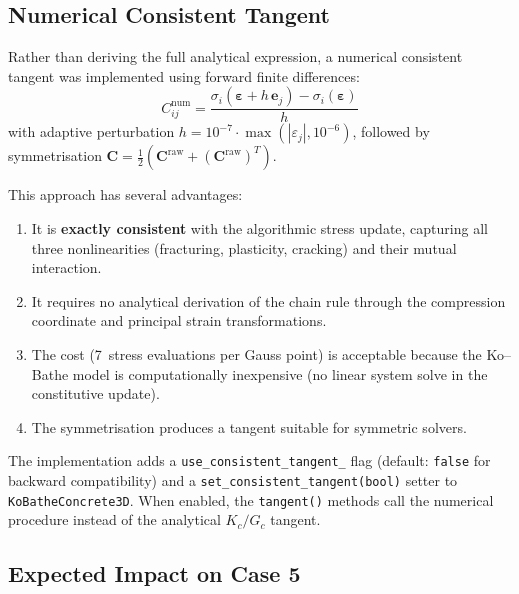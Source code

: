 \subsection{Numerical Consistent Tangent}

Rather than deriving the full analytical expression, a numerical
consistent tangent was implemented using forward finite differences:
\begin{equation}
  C_{ij}^{\text{num}} =
    \frac{\sigma_i(\boldsymbol{\varepsilon} + h\, \mathbf{e}_j)
        - \sigma_i(\boldsymbol{\varepsilon})}{h}
  \label{eq:numerical-tangent}
\end{equation}
with adaptive perturbation $h = 10^{-7} \cdot
\max(|\varepsilon_j|, 10^{-6})$, followed by symmetrisation
$\mathbf{C} = \tfrac{1}{2}(\mathbf{C}^{\text{raw}} +
(\mathbf{C}^{\text{raw}})^T)$.

This approach has several advantages:
\begin{enumerate}
  \item It is \textbf{exactly consistent} with the algorithmic stress
    update, capturing all three nonlinearities (fracturing, plasticity,
    cracking) and their mutual interaction.
  \item It requires no analytical derivation of the chain rule through
    the compression coordinate and principal strain transformations.
  \item The cost (7~stress evaluations per Gauss point) is acceptable
    because the Ko--Bathe model is computationally inexpensive (no
    linear system solve in the constitutive update).
  \item The symmetrisation produces a tangent suitable for symmetric
    solvers.
\end{enumerate}

The implementation adds a \texttt{use\_consistent\_tangent\_} flag
(default: \texttt{false} for backward compatibility) and a
\texttt{set\_consistent\_tangent(bool)} setter to
\texttt{KoBatheConcrete3D}.  When enabled, the \texttt{tangent()}
methods call the numerical procedure instead of the analytical
$K_c / G_c$ tangent.

\subsection{Expected Impact on Case 5}

